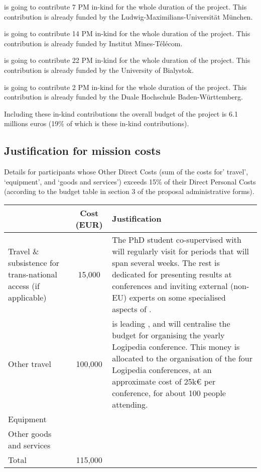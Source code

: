 is going to contribute 7 PM in-kind for the whole duration of the project.
This contribution is already funded by the Ludwig-Maximilians-Universit\"at M\"unchen.

 is going to contribute 14 PM in-kind for the whole duration of the project.
This contribution is already funded by Institut Mines-Télécom.

 is going to contribute 22 PM in-kind for the whole duration of the project.
This contribution is already funded by the University of Bialystok.

 is going to contribute 2 PM in-kind for the whole duration of the project.
This contribution is already funded by the Duale Hochschule Baden-Württemberg.

Including these in-kind contributions the overall budget of the project is
6.1 millions euros (19\% of which is these in-kind contributions).

\subsection*{Justification for mission costs}

Details for participants whose Other Direct Costs (sum of the costs
for’ travel’, ‘equipment’, and ‘goods and services’) exceeds 15\% of
their Direct Personal Costs (according to the budget table in section
3 of the proposal administrative forms).

\begin{longtable*}{|p{.25\textwidth}|c|p{0.55\textwidth}|}
\hline
   & Cost (EUR)  & Justification \\
  \hline
  Travel \& subsistence for trans-national access (if applicable) & 15,000 &

  The PhD student co-supervised with  will regularly visit
   for periods that will span several weeks.
  The rest is dedicated for
  presenting results at conferences and inviting external (non-EU) experts
  on some specialised aspects of .\\
  \hline
  Other travel & 100,000 &
   is leading , and will centralise the
  budget for organising the yearly Logipedia conference. This money is
  allocated to the organisation of the four Logipedia conferences, at an
  approximate cost of 25k€ per conference, for about 100 people attending.
   \\
  \hline
  Equipment & & \\
  \hline
  Other goods and services & & \\
  \hline
  Total & 115,000 & \\
  \hline
\end{longtable*}

